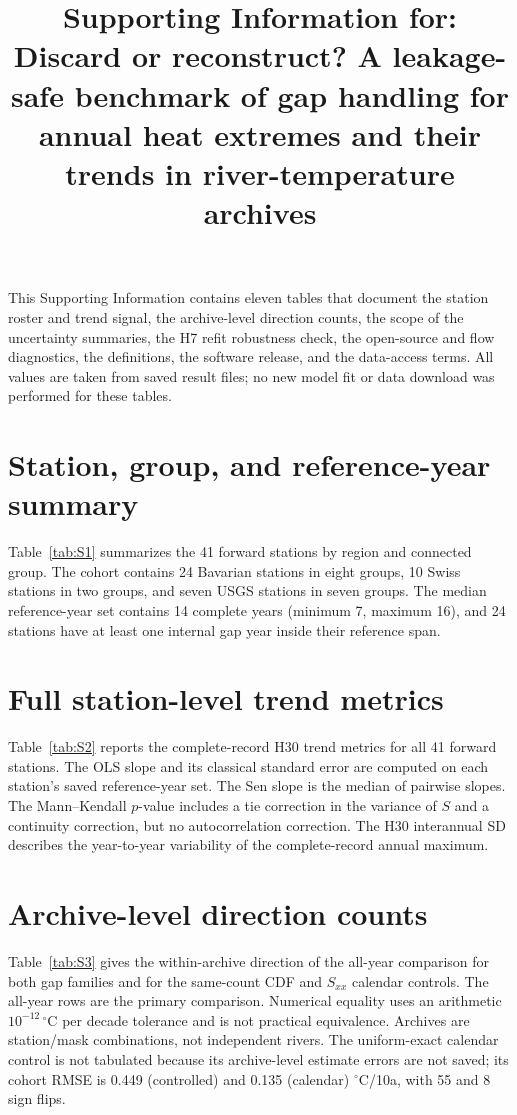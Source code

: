 \documentclass[preprint,12pt]{elsarticle}
\begin{document}
\setlength{\emergencystretch}{3em}

\begin{frontmatter}
\title{Supporting Information for: Discard or reconstruct? A leakage-safe benchmark of gap handling for annual heat extremes and their trends in river-temperature archives}
\end{frontmatter}

\noindent This Supporting Information contains eleven tables that document the station roster and trend signal, the archive-level direction counts, the scope of the uncertainty summaries, the H7 refit robustness check, the open-source and flow diagnostics, the definitions, the software release, and the data-access terms. All values are taken from saved result files; no new model fit or data download was performed for these tables.

\section{Station, group, and reference-year summary}
Table~\ref{tab:S1} summarizes the 41 forward stations by region and connected group. The cohort contains 24 Bavarian stations in eight groups, 10 Swiss stations in two groups, and seven USGS stations in seven groups. The median reference-year set contains 14 complete years (minimum 7, maximum 16), and 24 stations have at least one internal gap year inside their reference span.



\section{Full station-level trend metrics}
Table~\ref{tab:S2} reports the complete-record H30 trend metrics for all 41 forward stations. The OLS slope and its classical standard error are computed on each station's saved reference-year set. The Sen slope is the median of pairwise slopes. The Mann--Kendall $p$-value includes a tie correction in the variance of $S$ and a continuity correction, but no autocorrelation correction. The H30 interannual SD describes the year-to-year variability of the complete-record annual maximum.



\section{Archive-level direction counts}
Table~\ref{tab:S3} gives the within-archive direction of the all-year comparison for both gap families and for the same-count CDF and $S_{xx}$ calendar controls. The all-year rows are the primary comparison. Numerical equality uses an arithmetic $10^{-12}\,^{\circ}$C per decade tolerance and is not practical equivalence. Archives are station/mask combinations, not independent rivers. The uniform-exact calendar control is not tabulated because its archive-level estimate errors are not saved; its cohort RMSE is 0.449 (controlled) and 0.135 (calendar) $^{\circ}$C/10a, with 55 and 8 sign flips.
\end{document}
